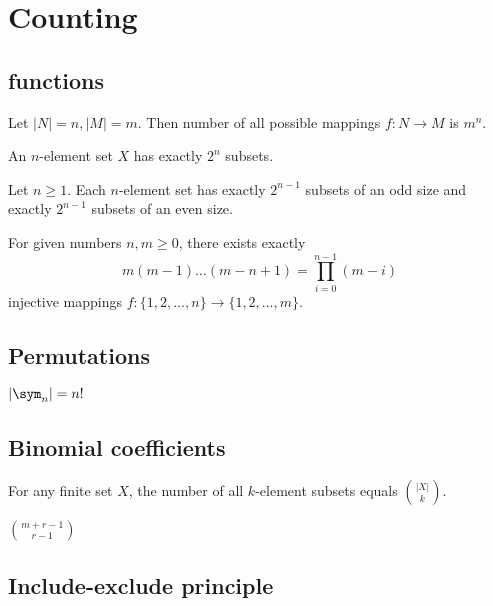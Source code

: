 \documentclass{classnotes}
\begin{document}
\section{Counting}

\subsection{functions}
\begin{proposition}
    Let $|N| =n, |M| = m$. Then number of all possible mappings $f: N \to M$ is $m^n$.
\end{proposition}

\begin{proposition}
    An  $n$-element set $X$ has exactly $2^n$ subsets.
\end{proposition}

\begin{proposition}
    Let $n \ge 1$. Each $n$-element set has exactly $2^{n-1}$ subsets of an odd size and exactly $2^{n-1}$ subsets of an even size.
\end{proposition}

\begin{proposition}
    For given numbers $n,m \ge 0$, there exists exactly
    $$m(m-1)\dots(m-n+1) = \prod_{i=0}^{n-1}(m-i)$$
    injective mappings $f: \{1,2,\dots,n\} \to \{1,2,\dots,m\}$.
\end{proposition}

\subsection{Permutations}
\begin{definition}[Permutation]
    $|\sym_n| = n!$
\end{definition}

\subsection{Binomial coefficients}
\begin{proposition}
    For any finite set $X$, the number of all $k$-element subsets equals $\binom{|X|}{k}$.
\end{proposition}

\begin{proposition}
    $\binom{m+r-1}{r-1}$
\end{proposition}

\subsection{Include-exclude principle}
\end{document}
